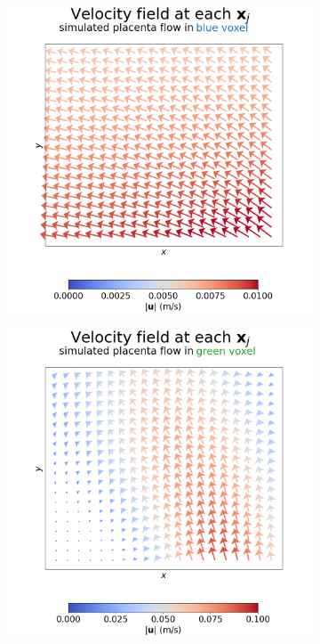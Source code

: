 \begin{figure}
\begin{centering}
\begin{subfigure}{0.45\textwidth}
\begin{centering}
                        \includegraphics[width=\textwidth]{diagrams/results-mri/simulated-placenta/mri-spins_quiver_2D_placenta_1_672.png}
                        \caption{}
                        \label{fig:mri-placenta-comparison-1:blue-flow}
                    \end{centering}
                \end{subfigure}
                \vspace{4mm} %
                \begin{subfigure}{0.45\textwidth}
                    \begin{centering}
                        \includegraphics[width=\textwidth]{diagrams/results-mri/simulated-placenta/mri-spins_quiver_2D_placenta_1_491.png}

\end{centering}
\end{subfigure}
\end{centering}
\end{figure}
